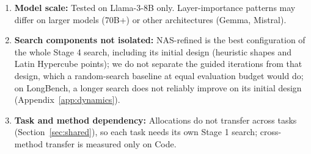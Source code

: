 \documentclass[11pt]{article}
\begin{document}
\begin{enumerate}
\item \textbf{Model scale:} Tested on Llama-3-8B only. Layer-importance patterns may differ on larger models (70B+) or other architectures (Gemma, Mistral).
\item \textbf{Search components not isolated:} NAS-refined is the best configuration of the whole Stage 4 search, including its initial design (heuristic shapes and Latin Hypercube points); we do not separate the guided iterations from that design, which a random-search baseline at equal evaluation budget would do; on LongBench, a longer search does not reliably improve on its initial design (Appendix~\ref{app:dynamics}).
\item \textbf{Task and method dependency:} Allocations do not transfer across tasks (Section~\ref{sec:shared}), so each task needs its own Stage 1 search; cross-method transfer is measured only on Code.
\end{enumerate}

\FloatBarrier




\end{document}
